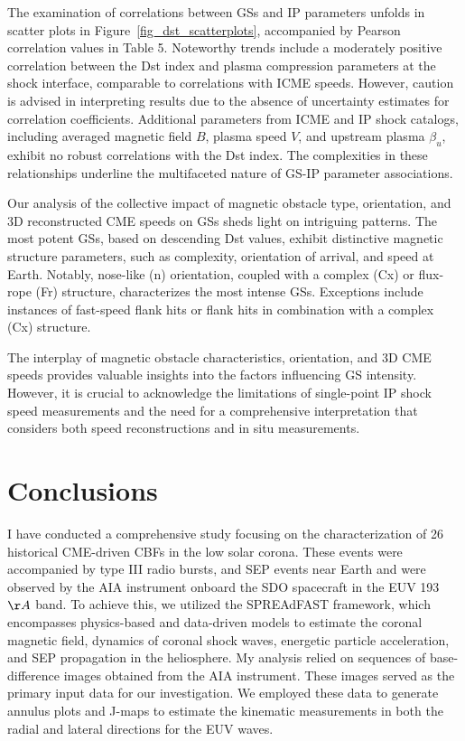 The examination of correlations between GSs and IP parameters unfolds in scatter plots in Figure~\ref{fig_dst_scatterplots}, accompanied by Pearson correlation values in Table 5. Noteworthy trends include a moderately positive correlation between the Dst index and plasma compression parameters at the shock interface, comparable to correlations with ICME speeds. However, caution is advised in interpreting results due to the absence of uncertainty estimates for correlation coefficients.
Additional parameters from ICME and IP shock catalogs, including averaged magnetic field $B$, plasma speed $V$, and upstream plasma $\beta_u$, exhibit no robust correlations with the Dst index. The complexities in these relationships underline the multifaceted nature of GS-IP parameter associations.

Our analysis of the collective impact of magnetic obstacle type, orientation, and 3D reconstructed CME speeds on GSs sheds light on intriguing patterns. The most potent GSs, based on descending Dst values, exhibit distinctive magnetic structure parameters, such as complexity, orientation of arrival, and speed at Earth. Notably, nose-like (n) orientation, coupled with a complex (Cx) or flux-rope (Fr) structure, characterizes the most intense GSs. Exceptions include instances of fast-speed flank hits or flank hits in combination with a complex (Cx) structure.

The interplay of magnetic obstacle characteristics, orientation, and 3D CME speeds provides valuable insights into the factors influencing GS intensity. However, it is crucial to acknowledge the limitations of single-point IP shock speed measurements and the need for a comprehensive interpretation that considers both speed reconstructions and in situ measurements.

\section{Conclusions}
I have conducted a comprehensive study focusing on the characterization of 26 historical CME-driven CBFs in the low solar corona. These events were accompanied by type III radio bursts, and SEP events near Earth and were observed by the AIA instrument onboard the SDO spacecraft in the EUV 193 $\AA$ band. To achieve this, we utilized the SPREAdFAST framework, which encompasses physics-based and data-driven models to estimate the coronal magnetic field, dynamics of coronal shock waves, energetic particle acceleration, and SEP propagation in the heliosphere.
My analysis relied on sequences of base-difference images obtained from the AIA instrument. These images served as the primary input data for our investigation. We employed these data to generate annulus plots and J-maps to estimate the kinematic measurements in both the radial and lateral directions for the EUV waves.

